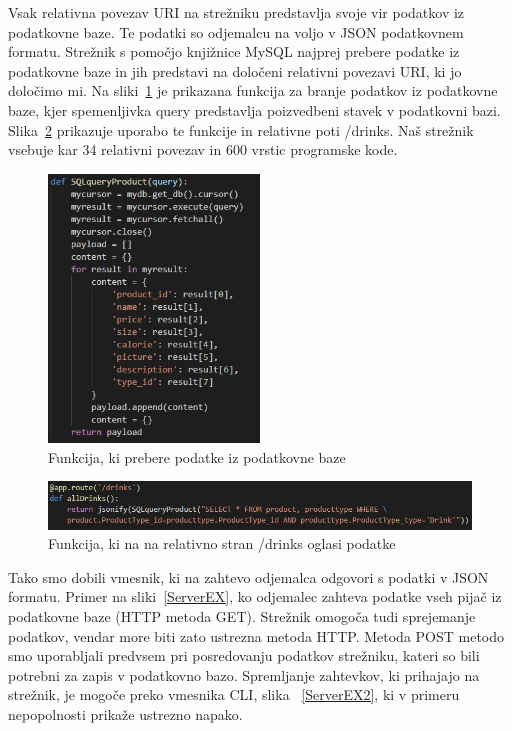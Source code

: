 \documentclass[a4paper, 12pt]{book}
\begin{document}
Vsak relativna povezav URI na strežniku predstavlja svoje vir podatkov iz podatkovne baze. Te podatki so odjemalcu na voljo v JSON podatkovnem formatu. Strežnik s pomočjo knjižnice MySQL najprej prebere podatke iz podatkovne baze in jih predstavi na določeni relativni povezavi URI, ki jo določimo mi. Na sliki~\ref{Drinks_DB_function} je prikazana funkcija za branje podatkov iz podatkovne baze, kjer spemenljivka query predstavlja poizvedbeni stavek v podatkovni bazi. Slika~\ref{Drinks_URI} prikazuje uporabo te funkcije in relativne poti /drinks. Naš strežnik vsebuje kar 34 relativni povezav in 600 vrstic programske kode.
\begin{figure}[!htb]
\begin{center}
\includegraphics[width=0.5\textwidth]{drinks_1.jpg}
\end{center}
\caption{Funkcija, ki prebere podatke iz podatkovne baze}
\label{Drinks_DB_function}
\end{figure}

\begin{figure}[!htb]
\begin{center}
\includegraphics[width=14cm]{drinks_2.jpg}
\end{center}
\caption{Funkcija, ki na na relativno stran /drinks oglasi podatke}
\label{Drinks_URI}
\end{figure}

Tako smo dobili vmesnik, ki na zahtevo odjemalca odgovori s podatki v JSON formatu. Primer na sliki~\ref{ServerEX}, ko odjemalec zahteva podatke vseh pijač iz podatkovne baze (HTTP metoda GET). Strežnik omogoča tudi sprejemanje podatkov, vendar more biti zato ustrezna metoda HTTP. Metoda POST metodo smo uporabljali predvsem pri posredovanju podatkov strežniku, kateri so bili potrebni za zapis v podatkovno bazo. Spremljanje zahtevkov, ki prihajajo na strežnik, je mogoče preko vmesnika CLI, slika ~\ref{ServerEX2}, ki v primeru nepopolnosti prikaže ustrezno napako.
\end{document}
